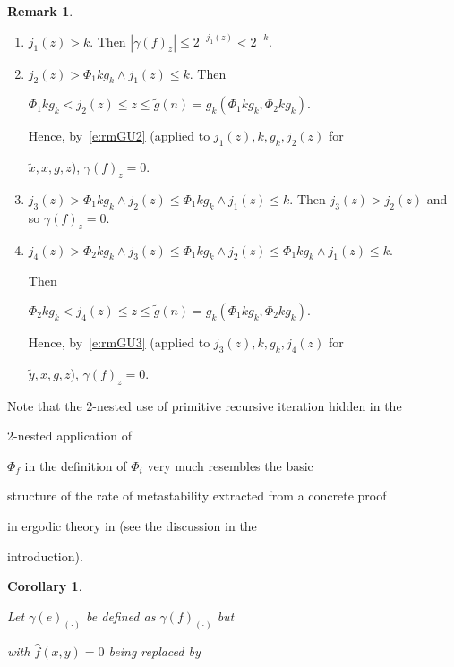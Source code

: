 \documentclass[1p]{elsarticle}
\theoremstyle{plain}
\newtheorem{cor}[thm]{Corollary}
\theoremstyle{definition}
\newtheorem{rmk}[thm]{Remark}
\theoremstyle{remark}
\theoremstyle{definition}
\begin{document}
{\begin{rmk}
\begin{enumerate}

\item $j_1(z)>k$. Then $|\gamma(f)_z|\leq2^{-j_1(z)}<2^{-k}$.

\item $j_2(z)>\Phi_1 kg_k\wedge j_1(z)\leq k$. Then 

$

\Phi_1 kg_k < j_2(z)\leq z \leq \tilde g(n)=g_k(\Phi_1 kg_k,\Phi_2 kg_k).

$

Hence, by~\eqref{e:rmGU2} (applied to $j_1(z),k,g_k,j_2(z)$ for 

$\tilde{x},x,g,z$), $\gamma(f)_z=0$.

\item $j_3(z)>\Phi_1 kg_k\wedge j_2(z)\leq\Phi_1 kg_k\wedge j_1(z)\leq k$. Then $j_3(z)>j_2(z)$ and so $\gamma(f)_z=0$.

\item $j_4(z)>\Phi_2 kg_k\wedge j_3(z)\leq\Phi_1 kg_k\wedge j_2(z)\leq\Phi_1 kg_k\wedge j_1(z)\leq k$. 

Then 

$

\Phi_2 kg_k < j_4(z)\leq z \leq \tilde g(n)=g_k(\Phi_1 kg_k,\Phi_2 kg_k).

$

Hence, by~\eqref{e:rmGU3} (applied to $j_3(z),k,g_k,j_4(z)$ for 

$\tilde{y},x,g,z$), $\gamma(f)_z=0$.

\end{enumerate}

Note that the 2-nested use of primitive recursive iteration hidden in the 

2-nested application of 

$\Phi_f$ in the definition of $\Phi_i$ very much resembles the basic 

structure of the rate of metastability extracted from a concrete proof 

in ergodic theory in \cite{Safarik(11)} (see the discussion in the 

introduction).

\end{rmk}



\begin{cor}\label{c:gammae}

Let $\gamma(e)_{(\cdot)}$ be defined as $\gamma(f)_{(\cdot)}$ but 

with $\widehat{f}(x,y)=0$ being replaced by 


\end{cor}}
\end{document}
